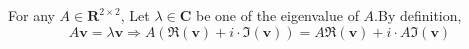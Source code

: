 \documentclass{article}
\begin{document}
\begin{enumerate} [label=(\arabic*)]
    For any $A\in\mathbf{R}^{2\times 2}$, Let $\lambda\in\mathbf{C}$ be one of the eigenvalue of $A$.By definition,
    \[A\mathbf{v}=\lambda\mathbf{v}\Rightarrow A(\Re(\mathbf{v})+i\cdot \Im(\mathbf{v}))=A\Re(\mathbf{v})+i\cdot A\Im(\mathbf{v})\]

\end{enumerate}
\end{document}

